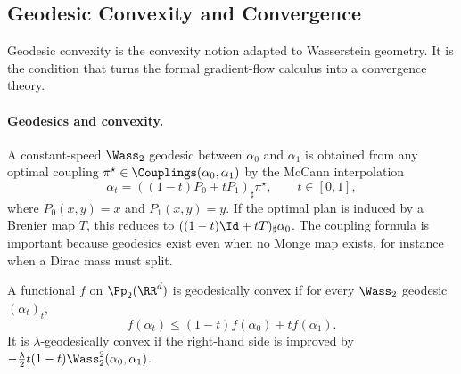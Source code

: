 \subsection{Geodesic Convexity and Convergence}
\label{sec-geodesic-convexity}

Geodesic convexity is the convexity notion adapted to Wasserstein geometry. It is the condition that turns the formal gradient-flow calculus into a convergence theory.

\paragraph{Geodesics and convexity.}

A constant-speed $\Wass_2$ geodesic between $\alpha_0$ and $\alpha_1$ is obtained from any optimal coupling $\pi^\star\in\Couplings(\alpha_0,\alpha_1)$ by the McCann interpolation
\[
	\alpha_t=((1-t)P_0+tP_1)_\sharp\pi^\star,
	\qquad t\in[0,1],
\]
where $P_0(x,y)=x$ and $P_1(x,y)=y$. If the optimal plan is induced by a Brenier map $T$, this reduces to $((1-t)\Id+tT)_\sharp\alpha_0$. The coupling formula is important because geodesics exist even when no Monge map exists, for instance when a Dirac mass must split.

\begin{defn}\label{def-geodesic-convexity}
	A functional $f$ on $\Pp_2(\RR^d)$ is geodesically convex if for every $\Wass_2$ geodesic $(\alpha_t)_t$,
	\[
		f(\alpha_t)\leq (1-t)f(\alpha_0)+t f(\alpha_1).
	\]
	It is $\lambda$-geodesically convex if the right-hand side is improved by $-\frac{\lambda}{2}t(1-t)\Wass_2^2(\alpha_0,\alpha_1)$.
\end{defn}

